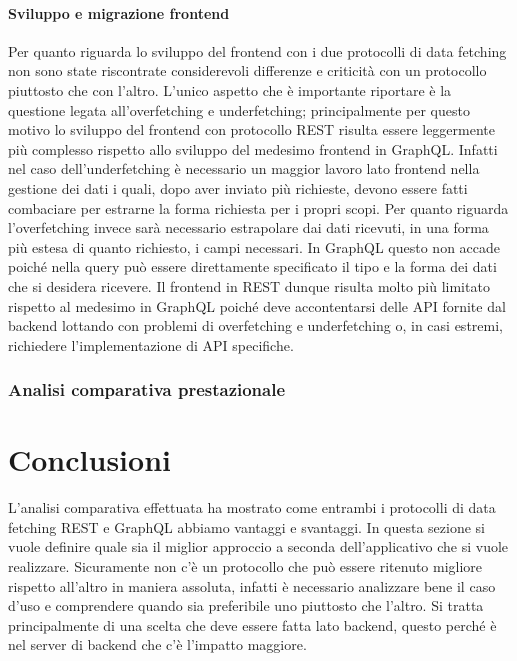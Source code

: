 \paragraph{Sviluppo e migrazione frontend}
Per quanto riguarda lo sviluppo del frontend con i due protocolli di data fetching non sono state riscontrate considerevoli differenze e criticità con un protocollo piuttosto che con l'altro. L'unico aspetto che è importante riportare è la questione legata all'overfetching e underfetching; principalmente per questo motivo lo sviluppo del frontend con protocollo REST risulta essere leggermente più complesso rispetto allo sviluppo del medesimo frontend in GraphQL. Infatti nel caso dell'underfetching è necessario un maggior lavoro lato frontend nella gestione dei dati i quali, dopo aver inviato più richieste, devono essere fatti combaciare per estrarne la forma richiesta per i propri scopi. Per quanto riguarda l'overfetching invece sarà necessario estrapolare dai dati ricevuti, in una forma più estesa di quanto richiesto, i campi necessari. In GraphQL questo non accade poiché nella query può essere direttamente specificato il tipo e la forma dei dati che si desidera ricevere. Il frontend in REST dunque risulta molto più limitato rispetto al medesimo in GraphQL poiché deve accontentarsi delle API fornite dal backend lottando con problemi di overfetching e underfetching o, in casi estremi, richiedere l'implementazione di API specifiche.








\subsubsection{Analisi comparativa prestazionale}
\section{Conclusioni}
L'analisi comparativa effettuata ha mostrato come entrambi i protocolli di data fetching REST e GraphQL abbiamo vantaggi e svantaggi. In questa sezione si vuole definire quale sia il miglior approccio a seconda dell'applicativo che si vuole realizzare. Sicuramente non c'è un protocollo che può essere ritenuto migliore rispetto all'altro in maniera assoluta, infatti è necessario analizzare bene il caso d'uso e comprendere quando sia preferibile uno piuttosto che l'altro. Si tratta principalmente di una scelta che deve essere fatta lato backend, questo perché è nel server di backend che c'è l'impatto maggiore.
